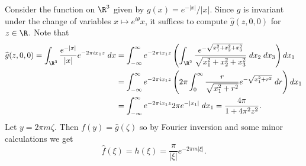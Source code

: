 \documentclass[11pt,letterpaper]{article}
\begin{document}
\begin{solution}
    \quad Consider the function on $\R^3$ given by $g(x)=e^{-|x|}/|x|$. Since $g$ is invariant under the change of variables $x \mapsto e^{i\theta}x$, it suffices to compute $\widehat{g}(z, 0, 0)$ for $z\in \R$. Note that
    \[
        \begin{aligned}
            \widehat{g}(z, 0, 0) = \int_{\R^3}\frac{e^{-|x|}}{|x|}e^{-2\pi i x_1 z}\;dx &= \int^\infty_{-\infty} e^{-2\pi i x_1 z}\left(\int_{\R^2}\frac{e^{-\sqrt{x_1^2+x_2^2+x_3^3}}}{\sqrt{x_1^2+x_2^2+x_3^2}}\;dx_2 \; dx_3\right)dx_1\\
            &=\int^\infty_{-\infty} e^{-2\pi i x_1 z}\left(2\pi \int_0^\infty\frac{r}{\sqrt{x_1^2+r^2}}e^{-\sqrt{x_1^2+r^2}}\;dr\right)dx_1\\
            &=\int^\infty_{-\infty} e^{-2\pi i x_1 z} 2\pi e^{-|x_1|}\;dx_1 = \frac{4\pi}{1+4\pi^2z^2}.
        \end{aligned}
    \] 
    Let $y = 2\pi m \zeta$. Then $f(y) = \widehat{g}(\zeta)$ so by Fourier inversion and some minor calculations we get
\[
\hat{f}(\xi) = h(\xi) = \frac{\pi}{|\xi|}e^{-2\pi m |\xi|}.
\]
\end{solution}
\end{document}
